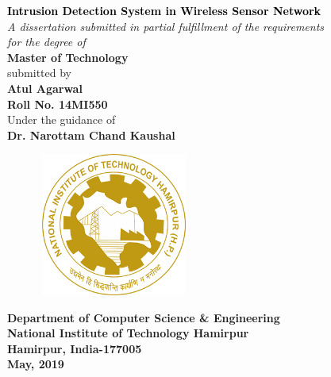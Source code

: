 \thispagestyle{empty}
\graphicspath{{Figures/PNG/}{Figures/}}
\begin{center}
	\vspace{8mm}
	\Large \textcolor{black}{\textbf{Intrusion Detection System in Wireless Sensor Network}}\\
	\vspace{10mm}
	\large \textit{A dissertation submitted in partial fulfillment of the requirements \\ for the degree of} \\
	\vspace{8mm}
	\Large {\textbf{Master of Technology}} \\
    \vspace{8mm}
    \large submitted by \\
    \vspace{8mm}
	\textbf{{\Large Atul Agarwal} \\ {\large Roll No. 14MI550}} \\
	\vspace{6mm}
	\large Under the guidance of \\
	\Large \textbf{Dr. Narottam Chand Kaushal}
	\vspace{5mm}
	\begin{figure}[h!]
		\centering
		\includegraphics[height=4.7cm,width=5cm]{NIT-Logo.png}
	\end{figure}
	\par\vspace{5mm}
	\large \textbf{Department of Computer Science \& Engineering\\
			National Institute of Technology Hamirpur\\
			Hamirpur, India-177005 \\
			May, 2019}
\end{center}
\thispagestyle{empty}
